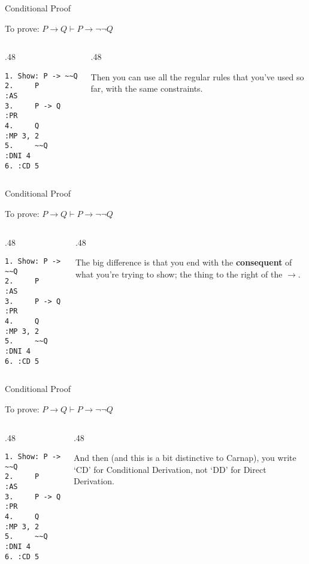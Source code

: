 \documentclass[
  ignorenonframetext,
]{beamer}
\renewcommand{\,}{\text{, }}
\def\begincols{\begin{columns}}
\def\begincol{\begin{column}}
\def\endcol{\end{column}}
\def\endcols{\end{columns}}
\begin{document}
\begin{frame}[fragile]{Conditional Proof}
\protect\hypertarget{conditional-proof}{}

To prove: \(P \rightarrow Q \vdash P \rightarrow \neg \neg Q\)

\bigskip

\begincols
\begincol{.48\textwidth}

\begin{verbatim}
1. Show: P -> ~~Q
2.     P          :AS
3.     P -> Q     :PR
4.     Q          :MP 3, 2
5.     ~~Q        :DNI 4
6. :CD 5
\end{verbatim}

\endcol
\begincol{.48\textwidth}

Then you can use all the regular rules that you've used so far, with the
same constraints.

\endcol
\endcols

\end{frame}

\begin{frame}[fragile]{Conditional Proof}
\protect\hypertarget{conditional-proof-1}{}

To prove: \(P \rightarrow Q \vdash P \rightarrow \neg \neg Q\)

\bigskip

\begincols
\begincol{.48\textwidth}

\begin{verbatim}
1. Show: P -> ~~Q
2.     P          :AS
3.     P -> Q     :PR
4.     Q          :MP 3, 2
5.     ~~Q        :DNI 4
6. :CD 5
\end{verbatim}

\endcol
\begincol{.48\textwidth}

The big difference is that you end with the \textbf{consequent} of what
you're trying to show; the thing to the right of the \(\rightarrow\).

\endcol
\endcols

\end{frame}

\begin{frame}[fragile]{Conditional Proof}
\protect\hypertarget{conditional-proof-2}{}

To prove: \(P \rightarrow Q \vdash P \rightarrow \neg \neg Q\)

\bigskip

\begincols
\begincol{.48\textwidth}

\begin{verbatim}
1. Show: P -> ~~Q
2.     P          :AS
3.     P -> Q     :PR
4.     Q          :MP 3, 2
5.     ~~Q        :DNI 4
6. :CD 5
\end{verbatim}

\endcol
\begincol{.48\textwidth}

And then (and this is a bit distinctive to Carnap), you write `CD' for
Conditional Derivation, not `DD' for Direct Derivation.

\endcol
\endcols

\end{frame}
\end{document}
